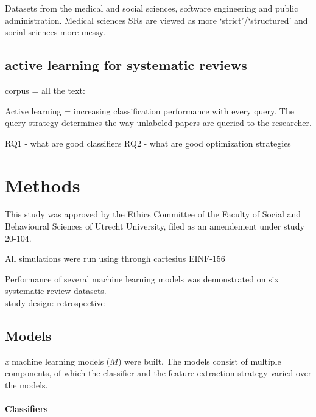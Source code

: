 \documentclass[
]{article}
\begin{document}
Datasets from the medical and social sciences, software engineering and
public administration. Medical sciences SRs are viewed as more
`strict'/`structured' and social sciences more messy.

\hypertarget{active-learning-for-systematic-reviews}{%
\subsection{active learning for systematic
reviews}\label{active-learning-for-systematic-reviews}}

corpus = all the text:

Active learning = increasing classification performance with every
query. The query strategy determines the way unlabeled papers are
queried to the researcher.

\autocite{modAL2018}

RQ1 - what are good classifiers RQ2 - what are good optimization
strategies

\newpage

\hypertarget{methods-1}{%
\section{Methods}\label{methods-1}}

This study was approved by the Ethics Committee of the Faculty of Social
and Behavioural Sciences of Utrecht University, filed as an amendement
under study 20-104.

All simulations were run using through cartesius EINF-156

Performance of several machine learning models was demonstrated on six
systematic review datasets.\\
study design: retrospective

\hypertarget{models}{%
\subsection{Models}\label{models}}

\emph{x} machine learning models (\(M\)) were built. The models consist
of multiple components, of which the classifier and the feature
extraction strategy varied over the models.

\hypertarget{classifiers}{%
\paragraph{Classifiers}\label{classifiers}}
\end{document}
